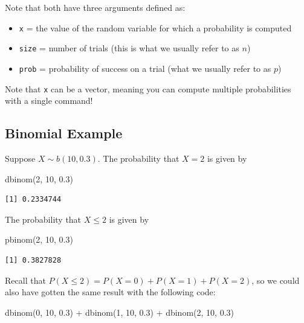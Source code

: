 \documentclass[
  letterpaper,
  DIV=11,
  numbers=noendperiod]{scrartcl}
\newenvironment{Shaded}{\begin{snugshade}}{\end{snugshade}}
\newcommand{\DecValTok}[1]{\textcolor[rgb]{0.68,0.00,0.00}{#1}}
\newcommand{\FloatTok}[1]{\textcolor[rgb]{0.68,0.00,0.00}{#1}}
\newcommand{\FunctionTok}[1]{\textcolor[rgb]{0.28,0.35,0.67}{#1}}
\newcommand{\NormalTok}[1]{\textcolor[rgb]{0.00,0.23,0.31}{#1}}
\newcommand{\SpecialCharTok}[1]{\textcolor[rgb]{0.37,0.37,0.37}{#1}}
\providecommand{\tightlist}{%
  \setlength{\itemsep}{0pt}\setlength{\parskip}{0pt}}
\begin{document}
Note that both have three arguments defined as:

\begin{itemize}
\tightlist
\item
  \texttt{x} = the value of the random variable for which a probability
  is computed
\item
  \texttt{size} = number of trials (this is what we usually refer to as
  \(n\))
\item
  \texttt{prob} = probability of success on a trial (what we usually
  refer to as \(p\))
\end{itemize}

Note that \texttt{x} can be a vector, meaning you can compute multiple
probabilities with a single command!

\subsection{Binomial Example}\label{binomial-example}

Suppose \(X \sim b(10, 0.3)\). The probability that \(X = 2\) is given
by

\begin{Shaded}
\begin{Highlighting}[]
\FunctionTok{dbinom}\NormalTok{(}\DecValTok{2}\NormalTok{, }\DecValTok{10}\NormalTok{, }\FloatTok{0.3}\NormalTok{)}
\end{Highlighting}
\end{Shaded}

\begin{verbatim}
[1] 0.2334744
\end{verbatim}

The probability that \(X \leq 2\) is given by

\begin{Shaded}
\begin{Highlighting}[]
\FunctionTok{pbinom}\NormalTok{(}\DecValTok{2}\NormalTok{, }\DecValTok{10}\NormalTok{, }\FloatTok{0.3}\NormalTok{)}
\end{Highlighting}
\end{Shaded}

\begin{verbatim}
[1] 0.3827828
\end{verbatim}

Recall that \(P(X \leq 2) = P(X = 0) + P(X = 1) + P(X = 2)\), so we
could also have gotten the same result with the following code:

\begin{Shaded}
\begin{Highlighting}[]
\FunctionTok{dbinom}\NormalTok{(}\DecValTok{0}\NormalTok{, }\DecValTok{10}\NormalTok{, }\FloatTok{0.3}\NormalTok{) }\SpecialCharTok{+} \FunctionTok{dbinom}\NormalTok{(}\DecValTok{1}\NormalTok{, }\DecValTok{10}\NormalTok{, }\FloatTok{0.3}\NormalTok{) }\SpecialCharTok{+} \FunctionTok{dbinom}\NormalTok{(}\DecValTok{2}\NormalTok{, }\DecValTok{10}\NormalTok{, }\FloatTok{0.3}\NormalTok{)}
\end{Highlighting}
\end{Shaded}
\end{document}
